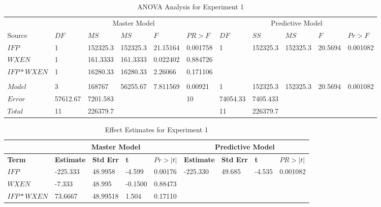 \documentclass[preprint]{sigplanconf}
\begin{document}
\begin{table}
  \centering
  \begin{tabular}{llllll|lllll}
    \multicolumn{1}{c}{} & \multicolumn{5}{c|}{Master Model}&\multicolumn{5}{c}{Predictive Model} \\
    Source&$DF$&$MS$&$MS$&$F$&$PR>F$&$DF$&$SS$&$MS$&$F$&$Pr>F$ \\
    \hline
    $IFP$&1&152325.3&152325.3 &21.15164&0.001758&1&152325.3&152325.3&20.5694&0.001082 \\
    $WXEN$&1&161.3333&161.3333&0.022402&0.884726&&&&& \\
    $IFP*WXEN$&1&16280.33&16280.33&2.26066&0.171106&&&&& \\
    &&&&&&&&&& \\
    $Model$&3&168767&56255.67&7.811569&0.00921&1&152325.3&152325.3&20.5694&0.001082 \\
    $Error$&57612.67&7201.583& & &10&74054.33&7405.433&&& \\
    $Total$&11&226379.7& & & &11&226379.7&&& \\
  \end{tabular}
  \caption{ANOVA Analysis for Experiment 1}
  \label{tab:AnovaExperiment1}
\end{table}

\begin{table}
  \centering
  \begin{tabular}{l|llll|llll}
    \multicolumn{1}{c}{}& \multicolumn{4}{c|}{Master Model } & \multicolumn{4}{c}{Predictive Model}\\
    \hline
    \bf{Term}&\bf{Estimate}&\bf{Std Err}&\bf{t}&\bf{$Pr>|t|$}&\bf{Estimate}&\bf{Std Err}&\bf{t}&\bf{$PR>|t|$}\\
    $IFP$&-225.333&48.9958&-4.599&0.00176&-225.330&49.685&-4.535&0.001082\\
    $WXEN$&-7.333&48.995&-0.1500&0.88473&&&&\\
    $IFP*WXEN$&73.6667&48.99518&1.504&0.17110&&&\\
  \end{tabular}
  \caption{Effect Estimates for Experiment 1}
  \label{tab:EffectEstimates1}
\end{table}
\end{document}
